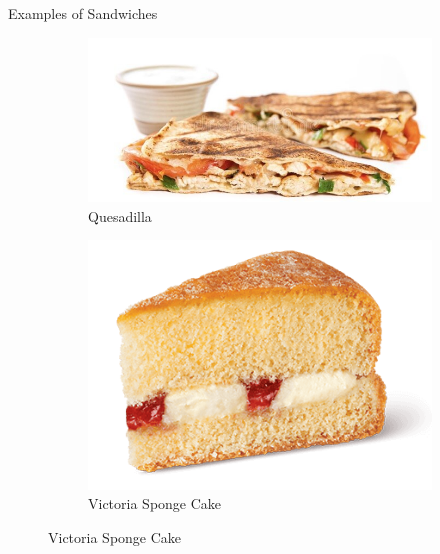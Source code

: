 \documentclass{beamer}
\begin{document}
\begin{frame}{Examples of Sandwiches}
    \begin{figure}
        \begin{subfigure}{.5\textwidth}
          \centering
          \includegraphics[width=\linewidth]{images/cube_rule_of_food/sandwich/19_quesadilla.jpg}
          \caption{\label{fig:quesadilla}Quesadilla}
        \end{subfigure}%
        \begin{subfigure}{.5\textwidth}
          \centering
          \includegraphics[width=.8\linewidth]{images/cube_rule_of_food/sandwich/19_victoria_sponge_cake.png}
          \caption{\label{fig:victoria-sponge}Victoria Sponge Cake}
        \end{subfigure}
    \end{figure}
\end{frame}
\end{document}
